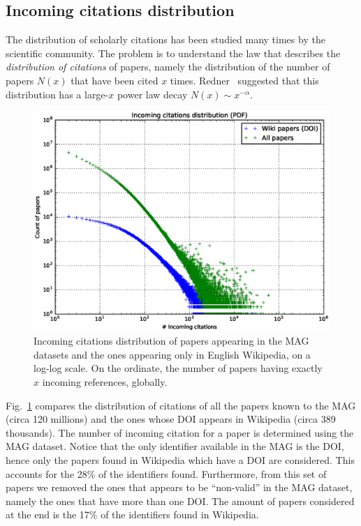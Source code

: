\subsection{Incoming citations distribution}
The distribution of scholarly citations has been studied many times by the scientific community.
The problem is to understand the law that describes the \emph{distribution of citations} of papers, namely the distribution of the number of papers $N(x)$ that have been cited $x$ times.
Redner~\cite{Redner1998} suggested that this distribution has a large-$x$ power law decay $N(x) \sim x^{-\alpha}$.

\begin{figure}[h]
\centering
\includegraphics[keepaspectratio=true, width=\textwidth]{assets/incoming_citations_distribution_pdf}
\caption{Incoming citations distribution of papers appearing in the \ac{MAG} datasets and the ones appearing only in English Wikipedia, on a log-log scale.
On the ordinate, the number of papers having exactly $x$ incoming references, globally.}
\label{fig:incoming_citations_distribution_pdf}
\end{figure}

Fig.~\ref{fig:incoming_citations_distribution_pdf} compares the distribution of citations of all the papers known to the MAG (circa 120 millions) and the ones whose \ac{DOI} appears in Wikipedia (circa 389 thousands).
The number of incoming citation for a paper is determined using the \ac{MAG} dataset.
Notice that the only identifier available in the \ac{MAG} is the \ac{DOI}, hence only the papers found in Wikipedia which have a \ac{DOI} are considered.
This accounts for the 28\% of the identifiers found.
Furthermore, from this set of papers we removed the ones that appears to be ``non-valid'' in the \ac{MAG} dataset, namely the ones that have more than one \ac{DOI}.
The amount of papers considered at the end is the 17\% of the identifiers found in Wikipedia.

